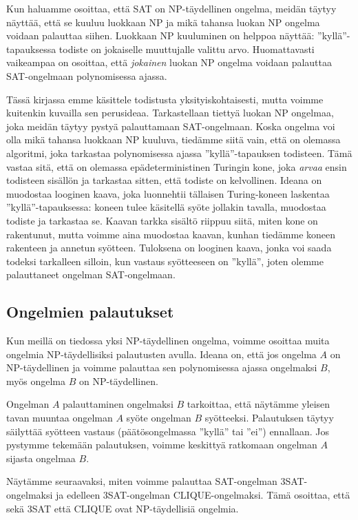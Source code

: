 Kun haluamme osoittaa, että SAT on NP-täydellinen ongelma,
meidän täytyy näyttää, että se kuuluu luokkaan NP ja mikä
tahansa luokan NP ongelma voidaan palauttaa siihen.
Luokkaan NP kuuluminen on helppoa näyttää:
''kyllä''-tapauksessa todiste on jokaiselle muuttujalle valittu arvo.
Huomattavasti vaikeampaa on osoittaa, että \emph{jokainen} luokan
NP ongelma voidaan palauttaa SAT-ongelmaan polynomisessa ajassa.

Tässä kirjassa emme käsittele todistusta yksityiskohtaisesti,
mutta voimme kuitenkin kuvailla sen perusideaa.
Tarkastellaan tiettyä luokan NP ongelmaa,
joka meidän täytyy pystyä palauttamaan SAT-ongelmaan.
Koska ongelma voi olla mikä tahansa luokkaan NP kuuluva, tiedämme siitä vain,
että on olemassa algoritmi, joka tarkastaa
polynomisessa ajassa ''kyllä''-tapauksen todisteen.
Tämä vastaa sitä, että on olemassa epädeterministinen
Turingin kone, joka \emph{arvaa} ensin todisteen sisällön ja
tarkastaa sitten, että todiste on kelvollinen.
Ideana on muodostaa looginen kaava, joka luonnehtii tällaisen
Turing-koneen laskentaa ''kyllä''-tapauksessa:
koneen tulee käsitellä syöte jollakin tavalla,
muodostaa todiste ja tarkastaa se.
Kaavan tarkka sisältö riippuu siitä, miten kone on rakentunut,
mutta voimme aina muodostaa kaavan, kunhan tiedämme koneen rakenteen
ja annetun syötteen.
Tuloksena on looginen kaava, jonka voi saada todeksi tarkalleen silloin,
kun vastaus syötteeseen on ''kyllä'',
joten olemme palauttaneet ongelman SAT-ongelmaan.

\subsection{Ongelmien palautukset}

Kun meillä on tiedossa yksi NP-täydellinen ongelma,
voimme osoittaa muita ongelmia NP-täydellisiksi palautusten avulla.
Ideana on, että jos ongelma $A$ on NP-täydellinen ja
voimme palauttaa sen polynomisessa ajassa ongelmaksi $B$,
myös ongelma $B$ on NP-täydellinen.

Ongelman $A$ palauttaminen ongelmaksi $B$ tarkoittaa,
että näytämme yleisen tavan muuntaa ongelman $A$ syöte
ongelman $B$ syötteeksi.
Palautuksen täytyy säilyttää syötteen vastaus
(päätösongelmassa ''kyllä'' tai ''ei'') ennallaan.
Jos pystymme tekemään palautuksen, voimme keskittyä ratkomaan ongelman
$A$ sijasta ongelmaa $B$.

Näytämme seuraavaksi, miten voimme palauttaa SAT-ongelman
3SAT-ongelmaksi ja edelleen 3SAT-ongelman CLIQUE-ongelmaksi.
Tämä osoittaa, että sekä 3SAT että CLIQUE
ovat NP-täydellisiä ongelmia.

